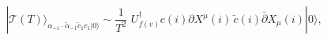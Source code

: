 \begin{equation}\label{E:masslessdivergence}
  |\mathcal{T}(T)\rangle_{\alpha_{-1} \cdot \tilde{\alpha}_{-1}
          \tilde{c}_1 c_1 |0\rangle} \sim
\frac{1}{T^2}\,\, U_{f(v)}^{\dagger} c(i)\partial X^{\mu}(i)\,\tilde{c}(i)
 \bar{\partial} X_{\mu}(i) |0\rangle,
\end{equation}

